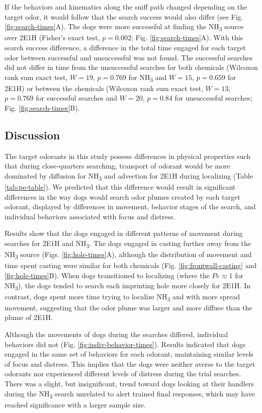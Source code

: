 \documentclass[
]{article}
\begin{document}
If the behaviors and kinematics along the sniff path changed depending on the target odor, it would follow that the search success would also differ (see Fig. \ref{fig:search-times}A). The dogs were more successful at finding the NH\textsubscript{3} source over 2E1H (Fisher's exact test, \(p = 0.002\); Fig. \ref{fig:search-times}A). With this search success difference, a difference in the total time engaged for each target odor between successful and unsuccessful was not found. The successful searches did not differ in time from the unsuccessful searches for both chemicals (Wilcoxon rank sum exact test, \(W = 19\), \(p = 0.769\) for NH\textsubscript{3} and \(W = 15\), \(p = 0.659\) for 2E1H) or between the chemicals (Wilcoxon rank sum exact test, \(W = 13\), \(p = 0.769\) for successful searches and \(W = 20\), \(p = 0.84\) for unsuccessful searches; Fig. \ref{fig:search-times}B).

\hypertarget{discussion}{%
\subsection{Discussion}\label{discussion}}

The target odorants in this study possess differences in physical properties such that during close-quarters searching, transport of odorant would be more dominated by diffusion for NH\textsubscript{3} and advection for 2E1H during localizing (Table \ref{tab:pe-table}). We predicted that this difference would result in significant differences in the way dogs would search odor plumes created by each target odorant, displayed by differences in movement, behavior stages of the search, and individual behaviors associated with focus and distress.

Results show that the dogs engaged in different patterns of movement during searches for 2E1H and NH\textsubscript{3}. The dogs engaged in casting further away from the NH\textsubscript{3} source (Figs. \ref{fig:hole-times}A), although the distribution of movement and time spent casting were similar for both chemicals (Fig. \ref{fig:frontwall-casting} and \ref{fig:hole-times}B). When dogs transitioned to localizing (where the \(Pe \approx 1\) for NH\textsubscript{3}), the dogs tended to search each imprinting hole more closely for 2E1H. In contrast, dogs spent more time trying to localize NH\textsubscript{3} and with more spread movement, suggesting that the odor plume was larger and more diffuse than the plume of 2E1H.

Although the movements of dogs during the searches differed, individual behaviors did not (Fig. \ref{fig:indiv-behavior-times}). Results indicated that dogs engaged in the same set of behaviors for each odorant, maintaining similar levels of focus and distress. This implies that the dogs were neither averse to the target odorants nor experienced different levels of distress during the trial searches. There was a slight, but insignificant, trend toward dogs looking at their handlers during the NH\textsubscript{3} search unrelated to alert trained final responses, which may have reached significance with a larger sample size.
\end{document}
